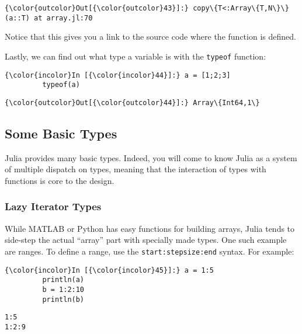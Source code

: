 \documentclass[11pt]{article}
\begin{document}
            \begin{Verbatim}[commandchars=\\\{\}]
{\color{outcolor}Out[{\color{outcolor}43}]:} copy\{T<:Array\{T,N\}\}(a::T) at array.jl:70
\end{Verbatim}
        
    Notice that this gives you a link to the source code where the function
is defined.

    Lastly, we can find out what type a variable is with the \texttt{typeof}
function:

    \begin{Verbatim}[commandchars=\\\{\}]
{\color{incolor}In [{\color{incolor}44}]:} a = [1;2;3]
         typeof(a)
\end{Verbatim}

            \begin{Verbatim}[commandchars=\\\{\}]
{\color{outcolor}Out[{\color{outcolor}44}]:} Array\{Int64,1\}
\end{Verbatim}
        
    \subsection{Some Basic Types}\label{some-basic-types}

Julia provides many basic types. Indeed, you will come to know Julia as
a system of multiple dispatch on types, meaning that the interaction of
types with functions is core to the design.

\subsubsection{Lazy Iterator Types}\label{lazy-iterator-types}

While MATLAB or Python has easy functions for building arrays, Julia
tends to side-step the actual ``array'' part with specially made types.
One such example are ranges. To define a range, use the
\texttt{start:stepsize:end} syntax. For example:

    \begin{Verbatim}[commandchars=\\\{\}]
{\color{incolor}In [{\color{incolor}45}]:} a = 1:5
         println(a)
         b = 1:2:10
         println(b)
\end{Verbatim}

    \begin{Verbatim}[commandchars=\\\{\}]
1:5
1:2:9

    \end{Verbatim}
\end{document}
